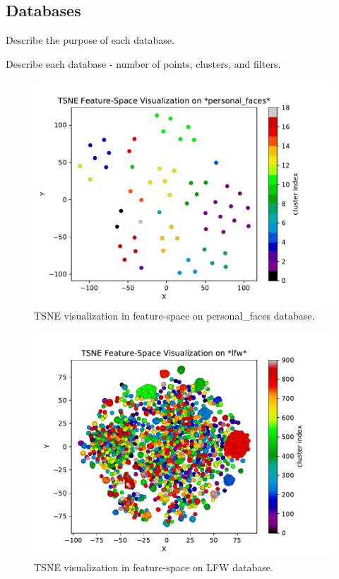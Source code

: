 \documentclass[conference]{IEEEtran}
\begin{document}
\subsection{Databases}

Describe the purpose of each database.

Describe each database - number of points, clusters, and filters.

\begin{figure}[h]
\label{tsne_view_personal_faces}
\includegraphics[width=\linewidth]{tsne_view_personal_faces}
\caption{TSNE visualization in feature-space on personal\_faces database.}
\end{figure}

\begin{figure}[h]
\label{tsne_view_lfw}
\includegraphics[width=\linewidth]{tsne_view_lfw}
\caption{TSNE visualization in feature-space on LFW database.}
\end{figure}
\end{document}
